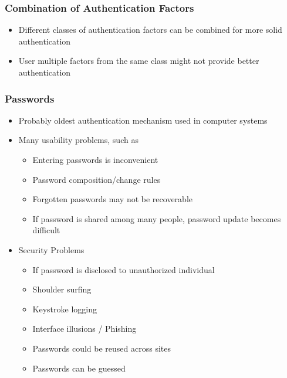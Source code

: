 \documentclass[twoside]{article}
\begin{document}
\subsubsection{Combination of Authentication Factors}
\begin{itemize}
\item Different classes of authentication factors can be combined for more solid authentication
\item User multiple factors from the same class might not provide better authentication
\end{itemize}

\subsubsection{Passwords}
\begin{itemize}
\item Probably oldest authentication mechanism used in computer systems
\item Many usability problems, such as 
\begin{itemize}
\item Entering passwords is inconvenient
\item Password composition/change rules
\item Forgotten passwords may not be recoverable 
\item If password is shared among many people, password update becomes difficult
\end{itemize}
\item Security Problems
\begin{itemize}
\item If password is disclosed to unauthorized individual
\item Shoulder surfing 
\item Keystroke logging
\item Interface illusions / Phishing 
\item Passwords could be reused across sites
\item Passwords can be guessed
\end{itemize}
\end{itemize}
\end{document}
